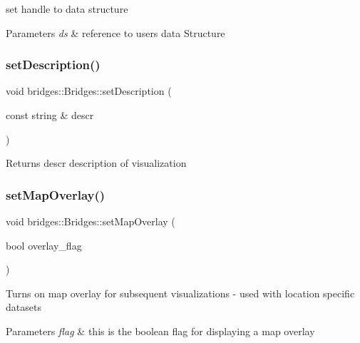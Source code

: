 set handle to data structure


\begin{DoxyParams}{Parameters}
{\em ds} & reference to user\textquotesingle{}s data Structure \\
\hline
\end{DoxyParams}
\mbox{\label{classbridges_1_1_bridges_aa26285a4d04c2759113dcf233406a8da}} 
\subsubsection{\texorpdfstring{set\+Description()}{setDescription()}}
{\footnotesize\ttfamily void bridges\+::\+Bridges\+::set\+Description (\begin{DoxyParamCaption}\item[{const string \&}]{descr }\end{DoxyParamCaption})\hspace{0.3cm}{\ttfamily [inline]}}

\begin{DoxyReturn}{Returns}
descr description of visualization 
\end{DoxyReturn}
\mbox{\label{classbridges_1_1_bridges_a221442c674b625a403486076cf8a7c03}} 
\subsubsection{\texorpdfstring{set\+Map\+Overlay()}{setMapOverlay()}}
{\footnotesize\ttfamily void bridges\+::\+Bridges\+::set\+Map\+Overlay (\begin{DoxyParamCaption}\item[{bool}]{overlay\+\_\+flag }\end{DoxyParamCaption})\hspace{0.3cm}{\ttfamily [inline]}}

Turns on map overlay for subsequent visualizations -\/ used with location specific datasets


\begin{DoxyParams}{Parameters}
{\em flag} & this is the boolean flag for displaying a map overlay \\
\hline
\end{DoxyParams}
\mbox{\label{classbridges_1_1_bridges_afa05302cf91c91b902aef693525107a5}} 
